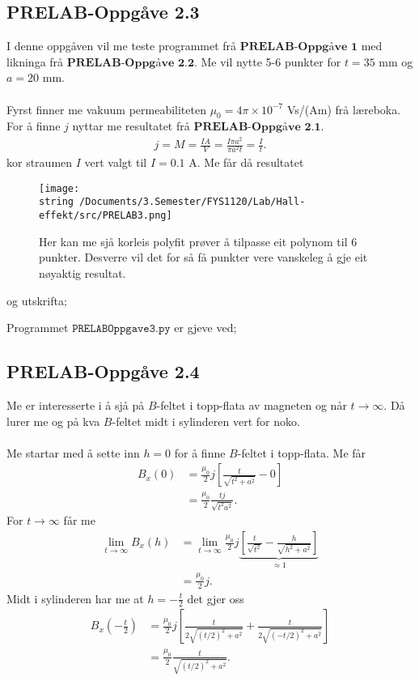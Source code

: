 \documentclass[11pt, a4paper]{article}
\begin{document}
  \subsection*{PRELAB-Oppgåve 2.3}
    I denne oppgåven vil me teste programmet frå $\textbf{PRELAB-Oppgåve 1}$ med likninga frå $\textbf{PRELAB-Oppgåve 2.2}$.
    Me vil nytte 5-6 punkter for $t = 35$ mm og $a = 20$ mm. \\ \\
    Fyrst finner me vakuum permeabiliteten $\mu_0 = 4\pi \times 10^{-7}$ Vs/(Am) frå læreboka. For å finne $j$ nyttar me resultatet frå $\textbf{PRELAB-Oppgåve 2.1}$.
    \begin{align*}
      j = M = \frac{IA}{V} = \frac{I\pi a^2}{\pi a^2t} = \frac{I}{t}.
    \end{align*}
    kor straumen $I$ vert valgt til $I = 0.1$ A. Me får då resultatet
    \begin{figure}[H]
      \centering
      \texttt{[image: \\string~/Documents/3.Semester/FYS1120/Lab/Hall-effekt/src/PRELAB3.png]}
      \caption{Her kan me sjå korleis polyfit prøver å tilpasse eit polynom til 6 punkter. Desverre vil det for så få punkter vere vanskeleg å gje eit nøyaktig resultat.}
    \end{figure}
    og utskrifta;
    
    Programmet $\texttt{PRELABOppgave3.py}$ er gjeve ved;
    

  \subsection*{PRELAB-Oppgåve 2.4}
    Me er interesserte i å sjå på $B$-feltet i topp-flata av magneten og når $t \to \infty$. Då lurer me og på kva $B$-feltet midt i sylinderen vert for noko. \\ \\
    Me startar med å sette inn $h = 0$ for å finne $B$-feltet i topp-flata. Me får
    \begin{align*}
      B_x(0) &= \frac{\mu_0}{2}j\left[ \frac{t}{\sqrt{t^2 + a^2}} - 0 \right] \\
      &= \frac{\mu_0}{2}\frac{tj}{\sqrt{t^2 a^2}}.
    \end{align*}
    For $t \to \infty$ får me
    \begin{align*}
      \lim_{t \to \infty} B_x(h) &= \lim_{t \to \infty} \frac{\mu_0}{2}j\underbrace{\left[ \frac{t}{\sqrt{t^2}} - \frac{h}{\sqrt{h^2 + a^2}} \right]}_{\approx 1} \\
      &= \frac{\mu_0}{2}j.
    \end{align*}
    Midt i sylinderen har me at $h = -\frac{t}{2}$ det gjer oss
    \begin{align*}
      B_x(-\frac{t}{2}) &= \frac{\mu_0}{2}j\left[ \frac{t}{2\sqrt{(t/2)^2 + a^2}} + \frac{t}{2\sqrt{(-t/2)^2 + a^2}} \right] \\
      &= \frac{\mu_0}{2}\frac{t}{\sqrt{(t/2)^2 + a^2}}.
    \end{align*}
\end{document}
